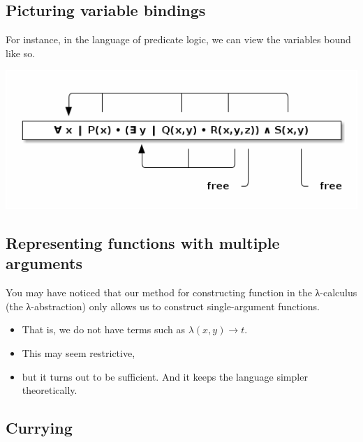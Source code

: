 \documentclass[11pt]{article}
\theoremstyle{definition}
\begin{document}
\subsection{Picturing variable bindings}
\label{sec:orgd98955b}

For instance, in the language of predicate logic,
we can view the variables bound like so.
\begin{center}
\includegraphics[width=\textwidth]{media/variable-binding.png}
\end{center}

\subsection{Representing functions with multiple arguments}
\label{sec:org47bc8c2}

You may have noticed that our method for constructing function
in the λ-calculus (the λ-abstraction)
only allows us to construct single-argument functions.
\begin{itemize}
\item That is, we do not have terms such as \(λ(x,y) → t\).
\item This may seem restrictive,
\item but it turns out to be sufficient.
And it keeps the language simpler theoretically.
\end{itemize}

\subsection{Currying}
\label{sec:org88817c2}
\end{document}
